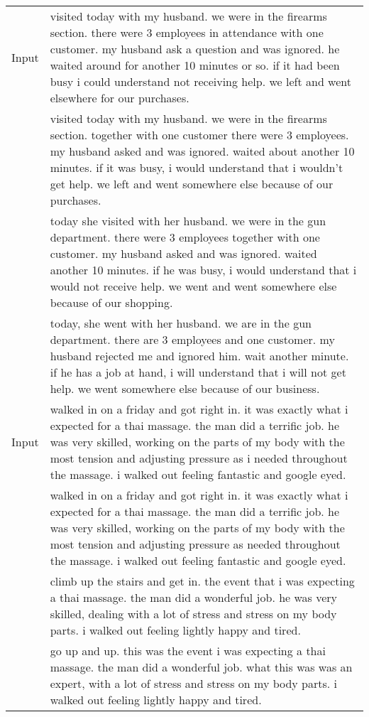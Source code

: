 \begin{table}[ht]
{\begin{tabular}[t]{c|p{16cm}}
\small Input	&visited today with my husband. we were in the firearms section. there were 3 employees in attendance with one customer. my husband ask a question and was ignored. he waited around for another 10 minutes or so. if it had been busy i could understand not receiving help. we left and went elsewhere for our purchases. \\
\small 	&visited today with my husband. we were in the firearms section. together with one customer there were 3 employees. my husband asked and was ignored. waited about another 10 minutes. if it was busy, i would understand that i wouldn't get help. we left and went somewhere else because of our purchases. \\
\small 	&today she visited with her husband. we were in the gun department. there were 3 employees together with one customer. my husband asked and was ignored. waited another 10 minutes. if he was busy, i would understand that i would not receive help. we went and went somewhere else because of our shopping. \\
\small 	&today, she went with her husband. we are in the gun department. there are 3 employees and one customer. my husband rejected me and ignored him. wait another minute. if he has a job at hand, i will understand that i will not get help. we went somewhere else because of our business. \\\hline
\small Input	&walked in on a friday and got right in. it was exactly what i expected for a thai massage. the man did a terrific job. he was very skilled, working on the parts of my body with the most tension and adjusting pressure as i needed throughout the massage. i walked out feeling fantastic and google eyed. \\
\small 	&walked in on a friday and got right in. it was exactly what i expected for a thai massage. the man did a terrific job. he was very skilled, working on the parts of my body with the most tension and adjusting pressure as needed throughout the massage. i walked out feeling fantastic and google eyed. \\
\small 	&climb up the stairs and get in. the event that i was expecting a thai massage. the man did a wonderful job. he was very skilled, dealing with a lot of stress and stress on my body parts. i walked out feeling lightly happy and tired. \\
\small 	&go up and up. this was the event i was expecting a thai massage. the man did a wonderful job. what this was was an expert, with a lot of stress and stress on my body parts. i walked out feeling lightly happy and tired. \\\hline

\end{tabular}}
\end{table}
